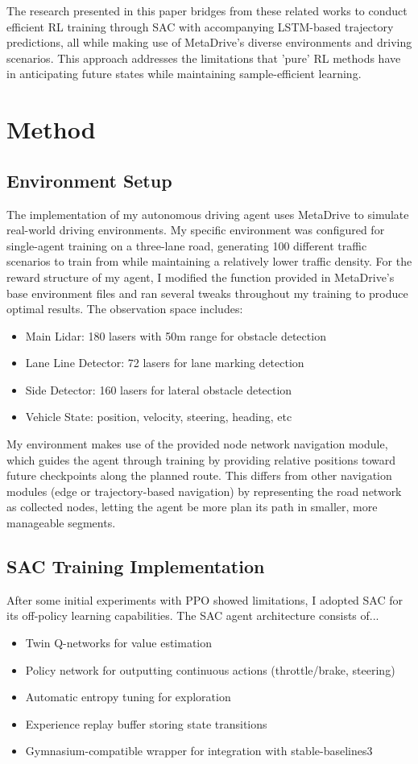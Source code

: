 \documentclass[10pt]{IEEEtran}
\begin{document}
The research presented in this paper bridges from these related works to conduct efficient RL training through SAC with accompanying LSTM-based trajectory predictions, all while making use of MetaDrive's diverse environments and driving scenarios. This approach addresses the limitations that 'pure' RL methods have in anticipating future states while maintaining sample-efficient learning.

\section{Method}
\subsection{Environment Setup}
The implementation of my autonomous driving agent uses MetaDrive to simulate real-world driving environments. My specific environment was configured for single-agent training on a three-lane road, generating 100 different traffic scenarios to train from while maintaining a relatively lower traffic density. For the reward structure of my agent, I modified the function provided in MetaDrive's base environment files and ran several tweaks throughout my training to produce optimal results. The observation space includes:
\begin{itemize}
\item Main Lidar: 180 lasers with 50m range for obstacle detection
\item Lane Line Detector: 72 lasers for lane marking detection
\item Side Detector: 160 lasers for lateral obstacle detection
\item Vehicle State: position, velocity, steering, heading, etc
\end{itemize}

My environment makes use of the provided node network navigation module, which guides the agent through training by providing relative positions toward future checkpoints along the planned route. This differs from other navigation modules (edge or trajectory-based navigation) by representing the road network as collected nodes, letting the agent be more plan its path in smaller, more manageable segments.

\subsection{SAC Training Implementation}
After some initial experiments with PPO showed limitations, I adopted SAC for its off-policy learning capabilities. The SAC agent architecture consists of...
\begin{itemize}
\item Twin Q-networks for value estimation
\item Policy network for outputting continuous actions (throttle/brake, steering)
\item Automatic entropy tuning for exploration
\item Experience replay buffer storing state transitions
\item Gymnasium-compatible wrapper for integration with stable-baselines3
\end{itemize}
\end{document}
